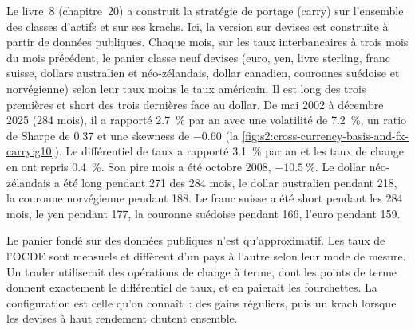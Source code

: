 Le livre~8 (chapitre~20) a construit la stratégie de portage (carry) sur l'ensemble des classes d'actifs et sur ses krachs. Ici, la version sur devises est construite à partir de données publiques. Chaque mois,
sur les taux interbancaires à trois mois du mois précédent, le panier classe neuf devises (euro, yen, livre sterling, franc suisse, dollars australien et néo-zélandais,
dollar canadien, couronnes suédoise et norvégienne) selon leur taux moins le taux américain. Il est long des trois premières et short des trois dernières face au
dollar. De mai 2002 à décembre 2025 (284 mois), il a rapporté 2.7~\% par an avec une volatilité de 7.2~\%, un ratio de Sharpe de 0.37 et une skewness de
$-0.60$ (la \cref{fig:s2:cross-currency-basis-and-fx-carry:g10}). Le différentiel de taux a rapporté 3.1~\% par an et les taux de change en ont repris 0.4~\%. Son
pire mois a été octobre 2008, $-10.5~\%$. Le dollar néo-zélandais a été long pendant 271 des 284 mois, le dollar australien pendant 218, la couronne norvégienne pendant 188. Le
franc suisse a été short pendant les 284 mois, le yen pendant 177, la couronne suédoise pendant 166, l'euro pendant 159.

\begin{omfigure}

\label{fig:s2:cross-currency-basis-and-fx-carry:g10}
\end{omfigure}

Le panier fondé sur des données publiques n'est qu'approximatif. Les taux de l'OCDE sont mensuels et diffèrent d'un pays à l'autre selon leur mode de mesure. Un trader utiliserait des opérations de change à terme, dont
les points de terme donnent exactement le différentiel de taux, et en paierait les fourchettes. La configuration est celle qu'on connaît~: des gains réguliers, puis un krach lorsque les
devises à haut rendement chutent ensemble.

